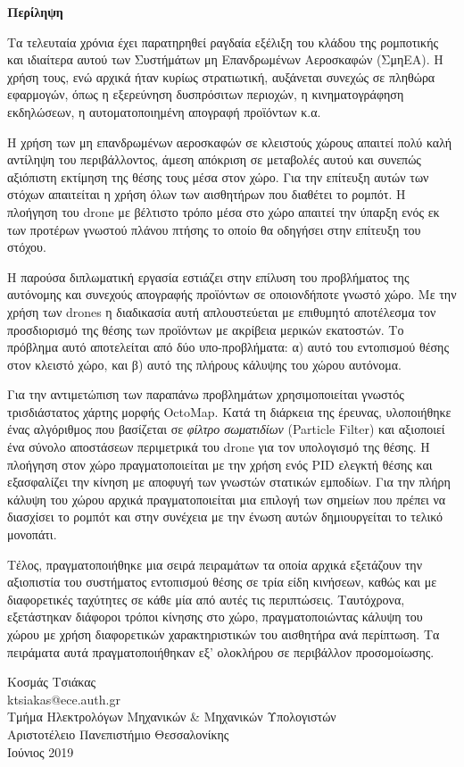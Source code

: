 \begin{center}
  \centering

  \vspace{0.5cm}
  \centering
  \textbf{\Large{Περίληψη}}

  \vspace{1cm}

\end{center}

Τα τελευταία χρόνια έχει παρατηρηθεί ραγδαία εξέλιξη του κλάδου της ρομποτικής και ιδιαίτερα αυτού των Συστήμάτων μη Επανδρωμένων Αεροσκαφών (ΣμηΕΑ). Η χρήση τους, ενώ αρχικά ήταν κυρίως στρατιωτική, αυξάνεται συνεχώς σε πληθώρα εφαρμογών, όπως η εξερεύνηση δυσπρόσιτων περιοχών, η κινηματογράφηση εκδηλώσεων, η αυτοματοποιημένη απογραφή προϊόντων κ.α. 

Η χρήση των μη επανδρωμένων αεροσκαφών σε κλειστούς χώρους απαιτεί πολύ καλή αντίληψη του περιβάλλοντος, άμεση απόκριση σε μεταβολές αυτού και συνεπώς αξιόπιστη εκτίμηση της θέσης τους μέσα στον χώρο. Για την επίτευξη αυτών των στόχων απαιτείται η χρήση όλων των αισθητήρων που διαθέτει το ρομπότ. Η πλοήγηση του drone με βέλτιστο τρόπο μέσα στο χώρο απαιτεί την ύπαρξη ενός εκ των προτέρων γνωστού πλάνου πτήσης το οποίο θα οδηγήσει στην επίτευξη του στόχου.

Η παρούσα διπλωματική εργασία εστιάζει στην επίλυση του προβλήματος της αυτόνομης και συνεχούς απογραφής προϊόντων σε οποιονδήποτε γνωστό χώρο. Με την χρήση των drones η διαδικασία αυτή απλουστεύεται με επιθυμητό αποτέλεσμα τον προσδιορισμό της θέσης των προϊόντων με ακρίβεια μερικών εκατοστών. Το πρόβλημα αυτό αποτελείται από δύο υπο-προβλήματα: α) αυτό του εντοπισμού θέσης στον κλειστό χώρο, και β) αυτό της πλήρους κάλυψης του χώρου αυτόνομα.     

Για την αντιμετώπιση των παραπάνω προβλημάτων χρησιμοποιείται γνωστός τρισδιάστατος χάρτης μορφής OctoMap. Κατά τη διάρκεια της έρευνας, υλοποιήθηκε ένας αλγόριθμος που βασίζεται σε \emph{φίλτρο σωματιδίων} (Particle Filter) και αξιοποιεί ένα σύνολο αποστάσεων περιμετρικά του drone για τον υπολογισμό της θέσης. Η πλοήγηση στον χώρο πραγματοποιείται με την χρήση ενός PID ελεγκτή θέσης και εξασφαλίζει την κίνηση με αποφυγή των γνωστών στατικών εμποδίων. Για την πλήρη κάλυψη του χώρου αρχικά πραγματοποιείται μια επιλογή των σημείων που πρέπει να διασχίσει το ρομπότ και στην συνέχεια με την ένωση αυτών δημιουργείται το τελικό μονοπάτι.

Τέλος, πραγματοποιήθηκε μια σειρά πειραμάτων τα οποία αρχικά εξετάζουν την αξιοπιστία του συστήματος εντοπισμού θέσης σε τρία είδη κινήσεων, καθώς και με διαφορετικές ταχύτητες σε κάθε μία από αυτές τις περιπτώσεις. Ταυτόχρονα, εξετάστηκαν διάφοροι τρόποι κίνησης στο χώρο, πραγματοποιώντας κάλυψη του χώρου με χρήση διαφορετικών χαρακτηριστικών του αισθητήρα ανά περίπτωση. Τα πειράματα αυτά πραγματοποιήθηκαν εξ' ολοκλήρου σε περιβάλλον προσομοίωσης.

\begin{flushright}
  \vspace{2cm}
  Κοσμάς Τσιάκας
  \\
  ktsiakas@ece.auth.gr
  \\
  Τμήμα Ηλεκτρολόγων Μηχανικών \& Μηχανικών Υπολογιστών
  \\
  Αριστοτέλειο Πανεπιστήμιο Θεσσαλονίκης
  \\
  Ιούνιος 2019
\end{flushright}